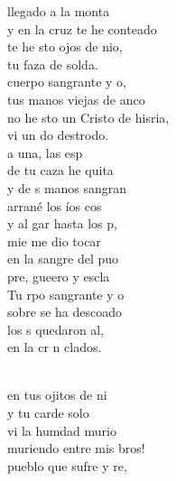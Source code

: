 \documentclass[12pt]{article}
\begin{document}
\begin{multicols*}{2}
\begin{cancion}%
	llegado a la monta\\
	y en la cruz te he conteado\\
	te he sto ojos de nio,\\
	tu faza de solda.\\
	cuerpo sangrante y o,\\
	tus manos viejas de anco\\
	no he sto un Cristo de hisria,\\
	vi un do destrodo.\\
	 a una, las esp\\
	de tu caza he quita\\
	y de s manos sangran\\
	arrané los íos cos\\
	y al gar hasta los p,\\
	mie me dio tocar\\
	en la sangre del puo\\
	pre, gueero y escla\\
	Tu rpo sangrante y o\\
	sobre  se ha descoado\\
	los s quedaron al, \\
	en la cr n clados.\\\jump\\
	\begin{chorus}%
	en tus ojitos de ni\\
	y tu carde solo\\
	vi la humdad murio\\
	muriendo entre mis bros!\\
	 pueblo que sufre y re,\\

\end{chorus}
\end{cancion}
\end{multicols*}
\end{document}
